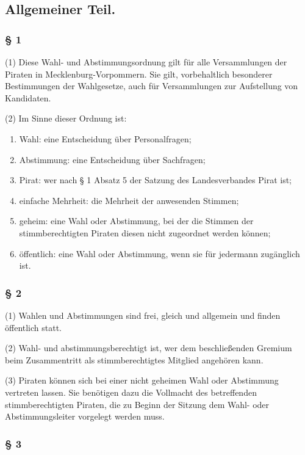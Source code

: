 \subsection{Allgemeiner Teil.}

\subsubsection{§ 1}

(1) Diese Wahl- und Abstimmungsordnung gilt für alle Versammlungen der
Piraten in Mecklenburg-Vorpommern. Sie gilt, vorbehaltlich besonderer
Bestimmungen der Wahlgesetze, auch für Versammlungen zur Aufstellung von
Kandidaten.

(2) Im Sinne dieser Ordnung ist:

\begin{enumerate}
\item
  Wahl: eine Entscheidung über Personalfragen;
\item
  Abstimmung: eine Entscheidung über Sachfragen;
\item
  Pirat: wer nach § 1 Absatz 5 der Satzung des Landesverbandes Pirat
  ist;
\item
  einfache Mehrheit: die Mehrheit der anwesenden Stimmen;
\item
  geheim: eine Wahl oder Abstimmung, bei der die Stimmen der
  stimmberechtigten Piraten diesen nicht zugeordnet werden können;
\item
  öffentlich: eine Wahl oder Abstimmung, wenn sie für jedermann
  zugänglich ist.
\end{enumerate}
\subsubsection{§ 2}

(1) Wahlen und Abstimmungen sind frei, gleich und allgemein und finden
öffentlich statt.

(2) Wahl- und abstimmungsberechtigt ist, wer dem beschließenden Gremium
beim Zusammentritt als stimmberechtigtes Mitglied angehören kann.

(3) Piraten können sich bei einer nicht geheimen Wahl oder Abstimmung
vertreten lassen. Sie benötigen dazu die Vollmacht des betreffenden
stimmberechtigten Piraten, die zu Beginn der Sitzung dem Wahl- oder
Abstimmungsleiter vorgelegt werden muss.

\subsubsection{§ 3}

